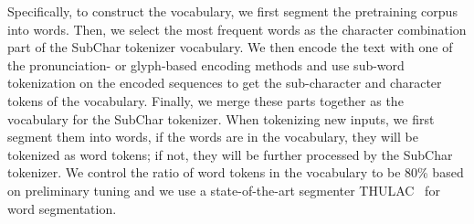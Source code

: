 Specifically, to construct the vocabulary, we first segment the pretraining corpus into words. Then, we select the most frequent words as the character combination part of the SubChar tokenizer vocabulary. We then encode the text with one of the pronunciation- or glyph-based encoding methods and use sub-word tokenization on the encoded sequences to get the sub-character and character tokens of the vocabulary.  Finally, we merge these parts together as the vocabulary for the SubChar tokenizer. When tokenizing new inputs, we first segment them into words, if the words are in the vocabulary, they will be tokenized as word tokens; if not, they will be further processed by the SubChar tokenizer.
We control the ratio of word tokens in the vocabulary to be 80\% based on preliminary tuning and we use a state-of-the-art segmenter THULAC~\cite{THULAC,THULAC-repo} for word segmentation.



  

